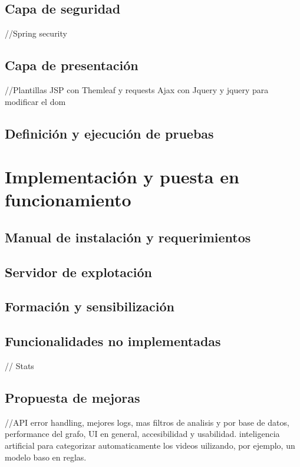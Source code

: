 \documentclass[11pt,a4paper]{article}
\begin{document}
\subsection{Capa de seguridad}
//Spring security
\medskip 

\subsection{Capa de presentación}
//Plantillas JSP con Themleaf y requests Ajax con Jquery y jquery para modificar el dom
\medskip 

\subsection{Definición y ejecución de pruebas}
\newpage 





\section{Implementación y puesta en funcionamiento}
\bigskip 

\subsection{Manual de instalación y requerimientos}
\medskip 

\subsection{Servidor de explotación}
\medskip 

\subsection{Formación y sensibilización}
\medskip 

\subsection{Funcionalidades no implementadas}
// Stats
\medskip 

\subsection{Propuesta de mejoras}
//API error handling, mejores logs, mas filtros de analisis y por base de datos, performance del grafo, UI en general, accesibilidad y usabilidad. inteligencia artificial para categorizar automaticamente los videos uilizando, por ejemplo, un modelo baso en reglas.
\newpage 
\end{document}
